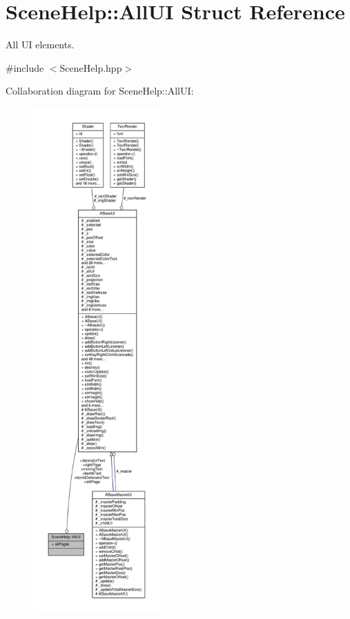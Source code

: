 \hypertarget{struct_scene_help_1_1_all_u_i}{}\section{Scene\+Help\+:\+:All\+UI Struct Reference}
\label{struct_scene_help_1_1_all_u_i}


All UI elements.  




{\ttfamily \#include $<$Scene\+Help.\+hpp$>$}



Collaboration diagram for Scene\+Help\+:\+:All\+UI\+:
\nopagebreak
\begin{figure}[H]
\begin{center}
\leavevmode
\includegraphics[height=550pt]{struct_scene_help_1_1_all_u_i__coll__graph}
\end{center}
\end{figure}
